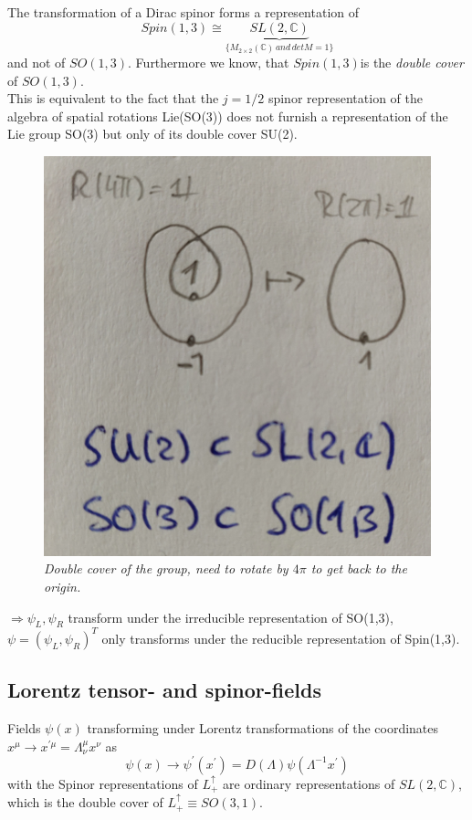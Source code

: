 The transformation of a Dirac spinor forms a representation of
\begin{equation}
Spin(1,3) \cong \underbrace{SL(2, \mathbb{C})}_{\{M_{2 \times 2} (\mathbb{C}) \, and \, detM=1 \} }
\end{equation}
and not of $SO(1,3)$. Furthermore we know, that $Spin(1,3)$is the  \emph{double cover} of $SO(1,3)$.\\
This is equivalent to the fact that the $j=1/2$ spinor representation of the algebra of spatial rotations Lie(SO(3)) does not furnish a representation of the Lie group SO(3) but only of its double cover SU(2).\\
\begin{figure}[h]
	\centering
	\includegraphics[width=0.7\linewidth]{gfx/doublecoverDiracSpinor}
	\caption{\itshape Double cover of the group, need to rotate by $4\pi$ to get back to the origin.}
	\label{fig:doublecoverdiracspinor}
\end{figure}

$\Rightarrow \psi_L, \psi_R$ transform under the irreducible representation of SO(1,3), $\psi=(\psi_L, \psi_R)^T$ only transforms under the reducible representation of Spin(1,3).

\subsection{Lorentz tensor- and spinor-fields}
Fields $\psi(x)$ transforming under Lorentz transformations of the coordinates $x^\mu \rightarrow x^{\prime \mu} = \Lambda^\mu_\nu x^\nu$ as
\begin{equation}
\label{eq:fieldsLorentztrafo}
	\psi(x) \rightarrow \psi^\prime(x^\prime) = D(\Lambda) \psi(\Lambda^{-1}x^\prime)
\end{equation}
with the 
Spinor representations of $L^\uparrow_+$ are ordinary representations of $SL(2, \mathbb{C})$, which is the double cover of $L^\uparrow_+ ≡ SO(3, 1)$.





